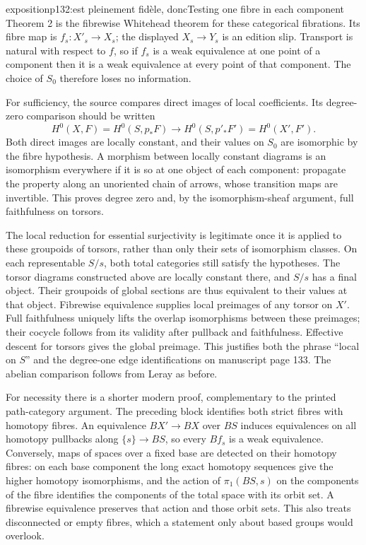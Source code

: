 \begin{dcomment}{exposition}{p132:est pleinement fidèle, donc}{Testing one fibre in each component}
Theorem 2 is the fibrewise Whitehead theorem for these categorical fibrations. Its fibre map is \(f_s:X'_s\longrightarrow X_s\); the displayed \(X_s\longrightarrow Y_s\) is an edition slip. Transport is natural with respect to \(f\), so if \(f_s\) is a weak equivalence at one point of a component then it is a weak equivalence at every point of that component. The choice of \(S_0\) therefore loses no information.

For sufficiency, the source compares direct images of local coefficients. Its degree-zero comparison should be written
\[
 H^0(X,F)=H^0(S,p_*F)\longrightarrow
 H^0(S,p'_*F')=H^0(X',F').
\]
Both direct images are locally constant, and their values on \(S_0\) are isomorphic by the fibre hypothesis. A morphism between locally constant diagrams is an isomorphism everywhere if it is so at one object of each component: propagate the property along an unoriented chain of arrows, whose transition maps are invertible. This proves degree zero and, by the isomorphism-sheaf argument, full faithfulness on torsors.

The local reduction for essential surjectivity is legitimate once it is applied to these groupoids of torsors, rather than only their sets of isomorphism classes. On each representable \(S/s\), both total categories still satisfy the hypotheses. The torsor diagrams constructed above are locally constant there, and \(S/s\) has a final object. Their groupoids of global sections are thus equivalent to their values at that object. Fibrewise equivalence supplies local preimages of any torsor on \(X'\). Full faithfulness uniquely lifts the overlap isomorphisms between these preimages; their cocycle follows from its validity after pullback and faithfulness. Effective descent for torsors gives the global preimage. This justifies both the phrase “local on \(S\)” and the degree-one edge identifications on manuscript page 133. The abelian comparison follows from Leray as before.

For necessity there is a shorter modern proof, complementary to the printed path-category argument. The preceding block identifies both strict fibres with homotopy fibres. An equivalence \(BX'\longrightarrow BX\) over \(BS\) induces equivalences on all homotopy pullbacks along \(\{s\}\longrightarrow BS\), so every \(Bf_s\) is a weak equivalence. Conversely, maps of spaces over a fixed base are detected on their homotopy fibres: on each base component the long exact homotopy sequences give the higher homotopy isomorphisms, and the action of \(\pi_1(BS,s)\) on the components of the fibre identifies the components of the total space with its orbit set. A fibrewise equivalence preserves that action and those orbit sets. This also treats disconnected or empty fibres, which a statement only about based groups would overlook.
\end{dcomment}


